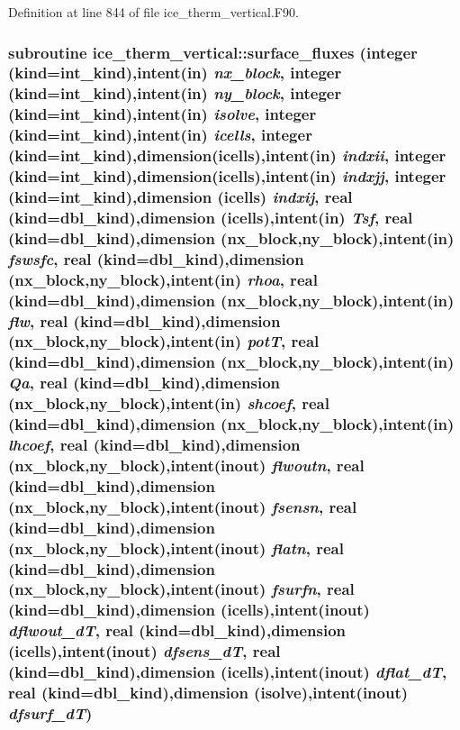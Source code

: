 Definition at line 844 of file ice\_\-therm\_\-vertical.F90.\hypertarget{namespaceice__therm__vertical_aa2320460f9c52d821db02db2209fa888}{
\subsubsection[{surface\_\-fluxes}]{\setlength{\rightskip}{0pt plus 5cm}subroutine ice\_\-therm\_\-vertical::surface\_\-fluxes (integer (kind=int\_\-kind),intent(in) {\em nx\_\-block}, \/  integer (kind=int\_\-kind),intent(in) {\em ny\_\-block}, \/  integer (kind=int\_\-kind),intent(in) {\em isolve}, \/  integer (kind=int\_\-kind),intent(in) {\em icells}, \/  integer (kind=int\_\-kind),dimension(icells),intent(in) {\em indxii}, \/  integer (kind=int\_\-kind),dimension(icells),intent(in) {\em indxjj}, \/  integer (kind=int\_\-kind),dimension (icells) {\em indxij}, \/  real (kind=dbl\_\-kind),dimension (icells),intent(in) {\em Tsf}, \/  real (kind=dbl\_\-kind),dimension (nx\_\-block,ny\_\-block),intent(in) {\em fswsfc}, \/  real (kind=dbl\_\-kind),dimension (nx\_\-block,ny\_\-block),intent(in) {\em rhoa}, \/  real (kind=dbl\_\-kind),dimension (nx\_\-block,ny\_\-block),intent(in) {\em flw}, \/  real (kind=dbl\_\-kind),dimension (nx\_\-block,ny\_\-block),intent(in) {\em potT}, \/  real (kind=dbl\_\-kind),dimension (nx\_\-block,ny\_\-block),intent(in) {\em Qa}, \/  real (kind=dbl\_\-kind),dimension (nx\_\-block,ny\_\-block),intent(in) {\em shcoef}, \/  real (kind=dbl\_\-kind),dimension (nx\_\-block,ny\_\-block),intent(in) {\em lhcoef}, \/  real (kind=dbl\_\-kind),dimension (nx\_\-block,ny\_\-block),intent(inout) {\em flwoutn}, \/  real (kind=dbl\_\-kind),dimension (nx\_\-block,ny\_\-block),intent(inout) {\em fsensn}, \/  real (kind=dbl\_\-kind),dimension (nx\_\-block,ny\_\-block),intent(inout) {\em flatn}, \/  real (kind=dbl\_\-kind),dimension (nx\_\-block,ny\_\-block),intent(inout) {\em fsurfn}, \/  real (kind=dbl\_\-kind),dimension (icells),intent(inout) {\em dflwout\_\-dT}, \/  real (kind=dbl\_\-kind),dimension (icells),intent(inout) {\em dfsens\_\-dT}, \/  real (kind=dbl\_\-kind),dimension (icells),intent(inout) {\em dflat\_\-dT}, \/  real (kind=dbl\_\-kind),dimension (isolve),intent(inout) {\em dfsurf\_\-dT})}}
\label{namespaceice__therm__vertical_aa2320460f9c52d821db02db2209fa888}



